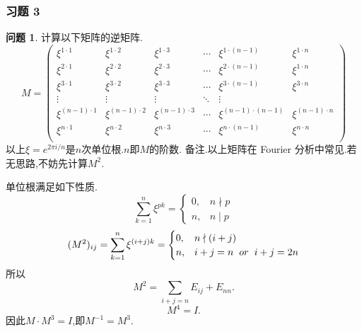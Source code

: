 \documentclass[11pt]{ctexart}
\theoremstyle{definition}
\newtheorem{qqq}{问题}[section]
\numberwithin{equation}{section}
\begin{document}
\subsubsection{习题 3}
\begin{qqq}
    计算以下矩阵的逆矩阵.
    \begin{equation}
        M=\begin{pmatrix}
            \xi^{1\cdot 1}&\xi^{1\cdot 2}&\xi^{1\cdot 3}&\cdots&\xi^{1\cdot (n-1)}&\xi^{1\cdot n}\\
            \xi^{2\cdot 1}&\xi^{2\cdot 2}&\xi^{2\cdot 3}&\cdots&\xi^{2\cdot (n-1)}&\xi^{1\cdot n}\\
            \xi^{3\cdot 1}&\xi^{3\cdot 2}&\xi^{3\cdot 3}&\cdots&\xi^{3\cdot (n-1)}&\xi^{3\cdot n}\\
            \vdots&\vdots&\vdots&\ddots&\vdots\\
            \xi^{(n-1)\cdot 1}&\xi^{(n-1)\cdot 2}&\xi^{(n-1)\cdot 3}&\cdots&\xi^{(n-1)\cdot (n-1)}&\xi^{(n-1)\cdot n}\\
            \xi^{n\cdot 1}&\xi^{n\cdot 2}&\xi^{n\cdot 3}&\cdots&\xi^{n\cdot (n-1)}&\xi^{n\cdot n}\\
        \end{pmatrix}
    \end{equation}
    以上$\xi =e^{2\pi i/n}$是$n$次单位根.$n$即$M$的阶数.
    备注.以上矩阵在 Fourier 分析中常见.若无思路,不妨先计算$M^2$.
\end{qqq}
\begin{aaa}
    单位根满足如下性质.
    \[ \sum_{k=1}^n \xi^{pk}=\begin{cases}
        0,&n \nmid p\\
        n,&n \mid p
    \end{cases}  \]
    \[ (M^2)_{ij}=\sum_{k=1}^n \xi^{(i+j)k}=\begin{cases}
        0,&n \nmid (i+j)\\
        n,&i+j=n\hspace{.2cm}or\hspace{.2cm}i+j=2n 
    \end{cases}  \]
    所以
    \[ M^2=\sum_{i+j=n}E_{ij}+E_{nn}. \]
    \[M^4=I.\]
    因此$M\cdot M^3=I$,即$M^{-1}=M^3.$
\end{aaa}
\end{document}
